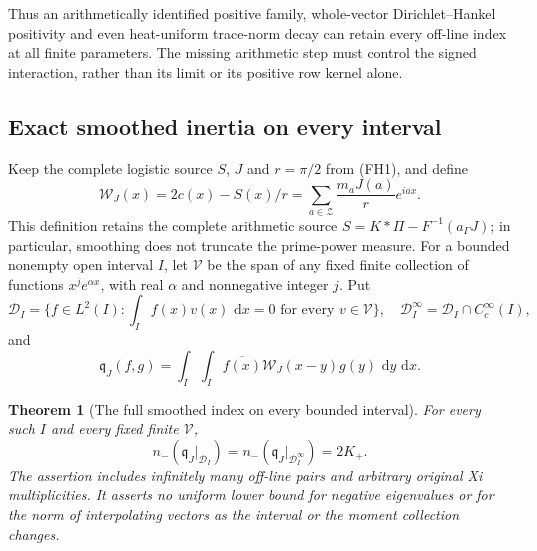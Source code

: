 \documentclass[11pt]{article}
\newtheorem{theorem}{Theorem}
\theoremstyle{remark}\newtheorem{remark}[theorem]{Remark}
\newcommand{\dd}{\,\mathrm d}
\begin{document}
Thus an arithmetically identified positive family, whole-vector
Dirichlet--Hankel positivity and even heat-uniform trace-norm decay
can retain every off-line index at all finite parameters. The missing
arithmetic step must control the signed interaction, rather than its
limit or its positive row kernel alone.

\subsection{Exact smoothed inertia on every interval}
\label{sec:local-smoothed-index}

Keep the complete logistic source \(S\), \(J\) and \(r=\pi/2\) from
(FH1), and define
\[
 \mathcal W_J(x)=2c(x)-S(x)/r
      =\sum_{a\in\mathcal Z}\frac{m_aJ(a)}r e^{iax}.
 \tag{LI1}
\]
This definition retains the complete arithmetic source
\(S=K*\Pi-F^{-1}(a_\Gamma J)\); in particular, smoothing does not
truncate the prime-power measure. For a bounded nonempty open
interval \(I\), let \(\mathcal V\) be the span of any fixed finite
collection of functions \(x^je^{\alpha x}\), with real \(\alpha\)
and nonnegative integer \(j\). Put
\[
 \mathcal D_I=\{f\in L^2(I):\int_I f(x)v(x)\,\dd x=0
                                  \text{ for every }v\in\mathcal V\},
 \quad \mathcal D_I^\infty=\mathcal D_I\cap C_c^\infty(I),
 \tag{LI2}
\]
and
\[
 \mathfrak q_J(f,g)=
   \int_I\int_I\overline{f(x)}\mathcal W_J(x-y)g(y)\,\dd y\,\dd x .
 \tag{LI3}
\]

\begin{theorem}[The full smoothed index on every bounded interval]
\label{thm:local-smoothed-index}
For every such \(I\) and every fixed finite \(\mathcal V\),
\[
 n_-(\mathfrak q_J|_{\mathcal D_I})
   =n_-(\mathfrak q_J|_{\mathcal D_I^\infty})=2K_+ .
 \tag{LI4}
\]
The assertion includes infinitely many off-line pairs and arbitrary
original Xi multiplicities. It asserts no uniform lower bound
for negative eigenvalues or for the norm of interpolating vectors
as the interval or the moment collection changes.
\end{theorem}
\end{document}
